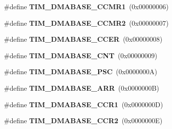 \begin{DoxyCompactItemize}
\item 
\hypertarget{group___t_i_m___d_m_a___base__address_gac94d74bf77d5ce139c7fa6e0b8c2da44}{\#define {\bfseries T\-I\-M\-\_\-\-D\-M\-A\-B\-A\-S\-E\-\_\-\-C\-C\-M\-R1}~(0x00000006)}\label{group___t_i_m___d_m_a___base__address_gac94d74bf77d5ce139c7fa6e0b8c2da44}

\item 
\hypertarget{group___t_i_m___d_m_a___base__address_ga94f3dcf13674f397fee0ef816ad973cf}{\#define {\bfseries T\-I\-M\-\_\-\-D\-M\-A\-B\-A\-S\-E\-\_\-\-C\-C\-M\-R2}~(0x00000007)}\label{group___t_i_m___d_m_a___base__address_ga94f3dcf13674f397fee0ef816ad973cf}

\item 
\hypertarget{group___t_i_m___d_m_a___base__address_ga64cb24a6d9d96d950be64586923c7447}{\#define {\bfseries T\-I\-M\-\_\-\-D\-M\-A\-B\-A\-S\-E\-\_\-\-C\-C\-E\-R}~(0x00000008)}\label{group___t_i_m___d_m_a___base__address_ga64cb24a6d9d96d950be64586923c7447}

\item 
\hypertarget{group___t_i_m___d_m_a___base__address_gae711483dbf4f0eafb2505b8f823c4724}{\#define {\bfseries T\-I\-M\-\_\-\-D\-M\-A\-B\-A\-S\-E\-\_\-\-C\-N\-T}~(0x00000009)}\label{group___t_i_m___d_m_a___base__address_gae711483dbf4f0eafb2505b8f823c4724}

\item 
\hypertarget{group___t_i_m___d_m_a___base__address_gae23315a3ef1af7dccfbbfada90355bd8}{\#define {\bfseries T\-I\-M\-\_\-\-D\-M\-A\-B\-A\-S\-E\-\_\-\-P\-S\-C}~(0x0000000\-A)}\label{group___t_i_m___d_m_a___base__address_gae23315a3ef1af7dccfbbfada90355bd8}

\item 
\hypertarget{group___t_i_m___d_m_a___base__address_ga3e08cd689d59f76dd5ca958a0ffdfb3d}{\#define {\bfseries T\-I\-M\-\_\-\-D\-M\-A\-B\-A\-S\-E\-\_\-\-A\-R\-R}~(0x0000000\-B)}\label{group___t_i_m___d_m_a___base__address_ga3e08cd689d59f76dd5ca958a0ffdfb3d}

\item 
\hypertarget{group___t_i_m___d_m_a___base__address_ga2d1bc7e5ae83b91caa352276d15142dc}{\#define {\bfseries T\-I\-M\-\_\-\-D\-M\-A\-B\-A\-S\-E\-\_\-\-C\-C\-R1}~(0x0000000\-D)}\label{group___t_i_m___d_m_a___base__address_ga2d1bc7e5ae83b91caa352276d15142dc}

\item 
\hypertarget{group___t_i_m___d_m_a___base__address_ga0c73e7e1fa212ab14a43ca49e9d8850e}{\#define {\bfseries T\-I\-M\-\_\-\-D\-M\-A\-B\-A\-S\-E\-\_\-\-C\-C\-R2}~(0x0000000\-E)}\label{group___t_i_m___d_m_a___base__address_ga0c73e7e1fa212ab14a43ca49e9d8850e}


\end{DoxyCompactItemize}
